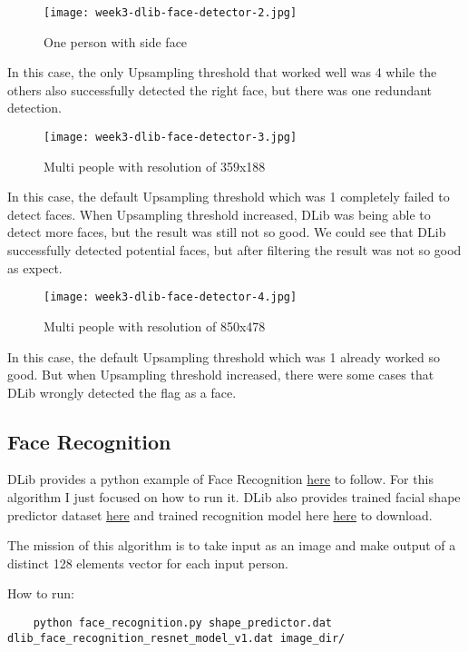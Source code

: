 \newpage
\begin{SCfigure}[0.5][!ht]
\caption{One person with side face}
\texttt{[image: week3-dlib-face-detector-2.jpg]}
\end{SCfigure}
In this case, the only Upsampling threshold that worked well was 4 while the others also successfully detected the right face, but there was one redundant detection.

\newpage
\begin{figure}[!ht]
\centering
\texttt{[image: week3-dlib-face-detector-3.jpg]}
\caption{Multi people with resolution of 359x188}
\end{figure}
In this case, the default Upsampling threshold which was 1 completely failed to detect faces. When Upsampling threshold increased, DLib was being able to detect more faces, but the result was still not so good. We could see that DLib successfully detected potential faces, but after filtering the result was not so good as expect.

\newpage
\begin{figure}[!ht]
\centering
\texttt{[image: week3-dlib-face-detector-4.jpg]}
\caption{Multi people with resolution of 850x478}
\end{figure}
In this case, the default Upsampling threshold which was 1 already worked so good. But when Upsampling threshold increased, there were some cases that DLib wrongly detected the flag as a face.

\newpage
\subsection{Face Recognition}
DLib provides a python example of Face Recognition \href{http://dlib.net/face_recognition.py.html}{here} to follow. For this algorithm I just focused on how to run it. DLib also provides trained facial shape predictor dataset \href{http://dlib.net/files/shape_predictor_5_face_landmarks.dat.bz2}{here} and trained recognition model here \href{http://dlib.net/files/dlib_face_recognition_resnet_model_v1.dat.bz2}{here} to download.

The mission of this algorithm is to take input as an image and make output of a distinct 128 elements vector for each input person.

How to run:
\begin{lstlisting}
    python face_recognition.py shape_predictor.dat 
dlib_face_recognition_resnet_model_v1.dat image_dir/
\end{lstlisting}

